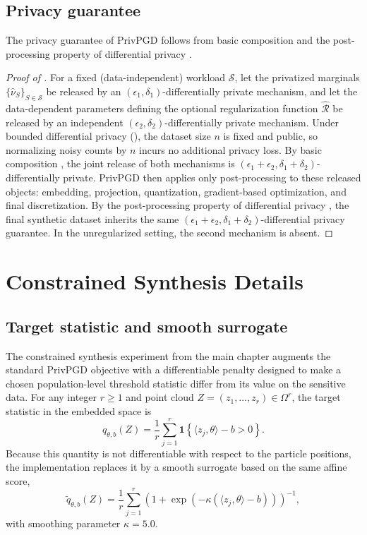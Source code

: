 \subsection{Privacy guarantee}
\label{app:privpgd-privacy}
The privacy guarantee of PrivPGD follows from basic composition and the post-processing property of differential privacy \citep{dwork2014algorithmic}.

\begin{proof}[Proof of ]
For a fixed (data-independent) workload \(\mathcal{S}\), let the privatized marginals \(\{\hat{\nu}_S\}_{S \in \mathcal{S}}\) be released by an \((\epsilon_1,\delta_1)\)-differentially private mechanism, and let the data-dependent parameters defining the optional regularization function \(\hat{\mathcal{R}}\) be released by an independent \((\epsilon_2,\delta_2)\)-differentially private mechanism. Under bounded differential privacy (), the dataset size \(n\) is fixed and public, so normalizing noisy counts by \(n\) incurs no additional privacy loss. By basic composition \citep{dwork2014algorithmic}, the joint release of both mechanisms is \((\epsilon_1+\epsilon_2,\delta_1+\delta_2)\)-differentially private. PrivPGD then applies only post-processing to these released objects: embedding, projection, quantization, gradient-based optimization, and final discretization. By the post-processing property of differential privacy \citep{dwork2014algorithmic}, the final synthetic dataset inherits the same \((\epsilon_1+\epsilon_2,\delta_1+\delta_2)\)-differential privacy guarantee. In the unregularized setting, the second mechanism is absent.
\end{proof}

\clearpage
\section{Constrained Synthesis Details}
\label{app:privpgd-constraints}

\subsection{Target statistic and smooth surrogate}

The constrained synthesis experiment from the main chapter augments the standard PrivPGD objective with a differentiable penalty designed to make a chosen population-level threshold statistic differ from its value on the sensitive data. For any integer \(r \geq 1\) and point cloud \(Z = (z_1,\dots,z_r) \in \Omega^r\), the target statistic in the embedded space is
\[
  q_{\theta,b}(Z)
  =
  \frac{1}{r}\sum_{j=1}^r \mathbf{1}\!\left\{\langle z_j, \theta \rangle - b > 0\right\}.
\]
Because this quantity is not differentiable with respect to the particle positions, the implementation replaces it by a smooth surrogate based on the same affine score,
\[
  \tilde q_{\theta,b}(Z)
  =
  \frac{1}{r}\sum_{j=1}^r
  \left(1 + \exp\!\left(-\kappa(\langle z_j, \theta \rangle - b)\right)\right)^{-1},
\]
with smoothing parameter \(\kappa = 5.0\).

